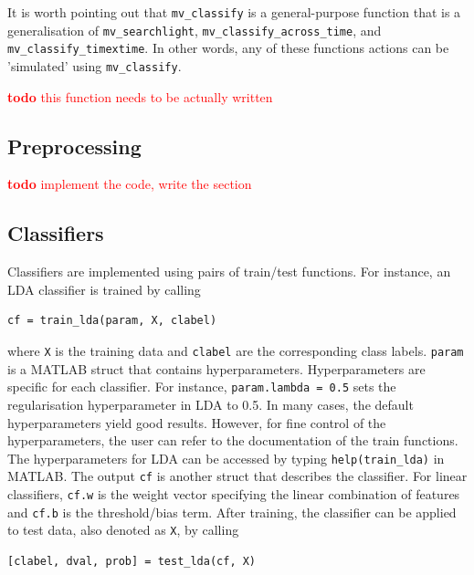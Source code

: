 \documentclass[utf8]{frontiersSCNS} %
\newcommand{\ttt}[1]{\texttt{#1}}
\newcommand{\todo}[1]{\textcolor{red}{\textbf{todo} #1}}
\begin{document}
It is worth pointing out that \texttt{mv\_classify} is a general-purpose function that is a generalisation of \texttt{mv\_searchlight}, \texttt{mv\_classify\_across\_time}, and \texttt{mv\_classify\_timextime}. In other words, any of these functions actions can be 'simulated' using \texttt{mv\_classify}.

\todo{this function needs to be actually written}


\subsection{Preprocessing}

\todo{implement the code, write the section}


\subsection{Classifiers}\label{sec:classifiers}

Classifiers are implemented using pairs of train/test functions. For instance, an LDA classifier is trained by calling

\begin{verbatim}
cf = train_lda(param, X, clabel)
\end{verbatim}

where \ttt{X} is the training data and \ttt{clabel} are the corresponding class labels. \ttt{param} is a MATLAB struct that contains hyperparameters. Hyperparameters are specific for each classifier. For instance, \ttt{param.lambda = 0.5} sets the regularisation hyperparameter in LDA to 0.5. In many cases, the default hyperparameters yield good results. However, for fine control of the hyperparameters, the user can refer to the documentation of the train functions. The hyperparameters for LDA can be accessed by typing \ttt{help(train\_lda)} in MATLAB. The output \ttt{cf} is another struct that describes the classifier. For linear classifiers, \ttt{cf.w} is the weight vector specifying the linear combination of features and \ttt{cf.b} is the threshold/bias term. After training, the classifier can be applied to test data, also denoted as \ttt{X}, by calling

\begin{verbatim}
[clabel, dval, prob] = test_lda(cf, X)
\end{verbatim}
\end{document}
